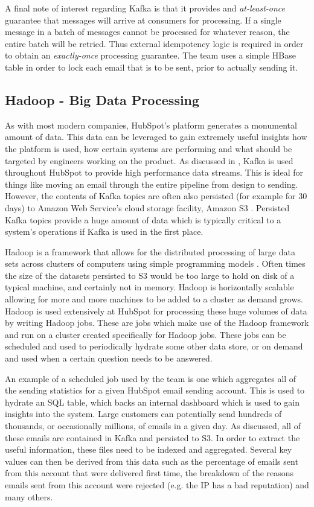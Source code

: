 A final note of interest regarding Kafka is that it provides and \textit{at-least-once} guarantee that messages will arrive at consumers for processing. If a single message in a batch of messages cannot be processed for whatever reason, the entire batch will be retried. Thus external idempotency logic is required in order to obtain an \textit{exactly-once} processing guarantee. The \team{} team uses a simple HBase table in order to lock each email that is to be sent, prior to actually sending it. 

\subsection{Hadoop - Big Data Processing}\label{sec:hadoop}
 As with most modern companies, HubSpot's platform generates a monumental amount of data. This data can be leveraged to gain extremely useful insights how the platform is used, how certain systems are performing and what should be targeted by engineers working on the product. As discussed in , Kafka is used throughout HubSpot to provide high performance data streams. This is ideal for things like moving an email through the entire pipeline from design to sending. However, the contents of Kafka topics are often also persisted (for example for 30 days) to Amazon Web Service's cloud storage facility, Amazon S3 \cite{s3} . Persisted Kafka topics provide a huge amount of data which is typically critical to a system's operations if Kafka is used in the first place. 
 
 Hadoop is a framework that allows for the distributed processing of large data sets across clusters of computers using simple programming models \cite{hadoop}. Often times the size of the datasets persisted to S3 would be too large to hold on disk of a typical machine, and certainly not in memory. Hadoop is horizontally scalable allowing for more and more machines to be added to a cluster as demand grows. Hadoop is used extensively at HubSpot for processing these huge volumes of data by writing Hadoop jobs. These are jobs which make use of the Hadoop framework and run on a cluster created specifically for Hadoop jobs. These jobs can be scheduled and used to periodically hydrate some other data store, or on demand and used when a certain question needs to be answered. 
 
 An example of a scheduled job used by the \team{} team is one which aggregates all of the sending statistics for a given HubSpot email sending account. This is used to hydrate an SQL table, which backs an internal dashboard which is used to gain insights into the system. Large customers can potentially send hundreds of thousands, or occasionally millions, of emails in a given day. As discussed, all of these emails are contained in Kafka and persisted to S3. In order to extract the useful information, these files need to be indexed and aggregated. Several key values can then be derived from this data such as the percentage of emails sent from this account that were delivered first time, the breakdown of the reasons emails sent from this account were rejected (e.g. the IP has a bad reputation) and many others.

